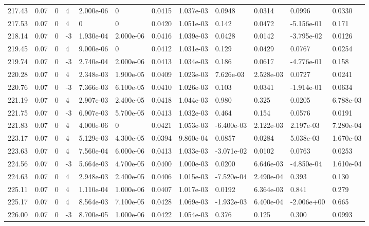 \documentclass[preview]{standalone}
\begin{document}
{{{{{{{{{{{\begin{tabular}{L{1.2cm}C{1.2cm} C{0.3cm}C{0.5cm} C{1.4cm}C{1.4cm} C{1.4cm}C{1.4cm} C{1.6cm}C{1.6cm} C{1.6cm}C{1.6cm}}
  217.43  &  0.07  & 0     &  4 &  2.000e-06  & 0  &  0.0415&   1.037e-03& 0.0948 & 0.0314   &  0.0996 & 0.0330  \\ 
  217.53  &  0.07  & 0     &  4 &  0  & 0  &  0.0420&   1.051e-03& 0.142 & 0.0472   &  -5.156e-01 & 0.171  \\ 
  218.14  &  0.07  & 0     & -3 &  1.930e-04  & 2.000e-06  &  0.0416&   1.039e-03& 0.0428 & 0.0142   &  -3.795e-02 & 0.0126  \\ 
  219.45  &  0.07  & 0     &  4 &  9.000e-06  & 0  &  0.0412&   1.031e-03& 0.129 & 0.0429   &  0.0767 & 0.0254  \\ 
  219.74  &  0.07  & 0     & -3 &  2.740e-04  & 2.000e-06  &  0.0413&   1.034e-03& 0.186 & 0.0617   &  -4.776e-01 & 0.158  \\ 
  220.28  &  0.07  & 0     &  4 &  2.348e-03  & 1.900e-05  &  0.0409&   1.023e-03& 7.626e-03 & 2.528e-03   &  0.0727 & 0.0241  \\ 
  220.76  &  0.07  & 0     & -3 &  7.366e-03  & 6.100e-05  &  0.0410&   1.026e-03& 0.103 & 0.0341   &  -1.914e-01 & 0.0634  \\ 
  221.19  &  0.07  & 0     &  4 &  2.907e-03  & 2.400e-05  &  0.0418&   1.044e-03& 0.980 & 0.325   &  0.0205 & 6.788e-03  \\ 
  221.75  &  0.07  & 0     & -3 &  6.907e-03  & 5.700e-05  &  0.0413&   1.032e-03& 0.464 & 0.154   &  0.0576 & 0.0191  \\ 
  221.83  &  0.07  & 0     &  4 &  4.000e-06  & 0  &  0.0421&   1.053e-03& -6.400e-03 & 2.122e-03   &  2.197e-03 & 7.280e-04  \\ 
  223.17  &  0.07  & 0     &  4 &  5.129e-03  & 4.300e-05  &  0.0394&   9.860e-04& 0.0857 & 0.0284   &  5.038e-03 & 1.670e-03  \\ 
  223.63  &  0.07  & 0     &  4 &  7.560e-04  & 6.000e-06  &  0.0413&   1.033e-03& -3.071e-02 & 0.0102   &  0.0763 & 0.0253  \\ 
  224.56  &  0.07  & 0     & -3 &  5.664e-03  & 4.700e-05  &  0.0400&   1.000e-03& 0.0200 & 6.646e-03   &  -4.850e-04 & 1.610e-04  \\ 
  224.63  &  0.07  & 0     &  4 &  2.948e-03  & 2.400e-05  &  0.0406&   1.015e-03& -7.520e-04 & 2.490e-04   &  0.393 & 0.130  \\ 
  225.11  &  0.07  & 0     &  4 &  1.110e-04  & 1.000e-06  &  0.0407&   1.017e-03& 0.0192 & 6.364e-03   &  0.841 & 0.279  \\ 
  225.17  &  0.07  & 0     &  4 &  8.564e-03  & 7.100e-05  &  0.0428&   1.069e-03& -1.932e-03 & 6.400e-04   &  -2.006e+00 & 0.665  \\ 
  226.00  &  0.07  & 0     & -3 &  8.700e-05  & 1.000e-06  &  0.0422&   1.054e-03& 0.376 & 0.125   &  0.300 & 0.0993  \\ 
\hline 
\end{tabular} 

}}}}}}}}}}}
\end{document}
